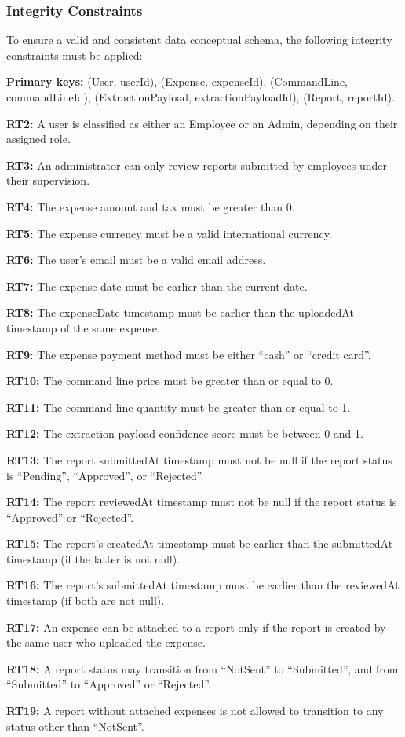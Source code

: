\subsubsection{Integrity Constraints}

To ensure a valid and consistent data conceptual schema, the following integrity constraints must be applied:

\textbf{Primary keys:} (User, userId), (Expense, expenseId), (CommandLine, commandLineId), (ExtractionPayload, extractionPayloadId), (Report, reportId).

\textbf{RT2:} A user is classified as either an Employee or an Admin, depending on their assigned role.

\textbf{RT3:} An administrator can only review reports submitted by employees under their supervision.

\textbf{RT4:} The expense amount and tax must be greater than 0.

\textbf{RT5:} The expense currency must be a valid international currency.

\textbf{RT6:} The user's email must be a valid email address.

\textbf{RT7:} The expense date must be earlier than the current date.

\textbf{RT8:} The expenseDate timestamp must be earlier than the uploadedAt timestamp of the same expense.

\textbf{RT9:} The expense payment method must be either “cash” or “credit card”.

\textbf{RT10:} The command line price must be greater than or equal to 0.

\textbf{RT11:} The command line quantity must be greater than or equal to 1.

\textbf{RT12:} The extraction payload confidence score must be between 0 and 1.

\textbf{RT13:} The report submittedAt timestamp must not be null if the report status is “Pending”, “Approved”, or “Rejected”.

\textbf{RT14:} The report reviewedAt timestamp must not be null if the report status is “Approved” or “Rejected”.

\textbf{RT15:} The report's createdAt timestamp must be earlier than the submittedAt timestamp (if the latter is not null).

\textbf{RT16:} The report's submittedAt timestamp must be earlier than the reviewedAt timestamp (if both are not null).

\textbf{RT17:} An expense can be attached to a report only if the report is created by the same user who uploaded the expense.

\textbf{RT18:} A report status may transition from “NotSent” to “Submitted”, and from “Submitted” to “Approved” or “Rejected”.

\textbf{RT19:} A report without attached expenses is not allowed to transition to any status other than “NotSent”.
